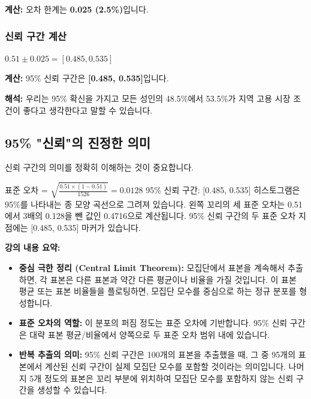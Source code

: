 \documentclass[11pt,a4paper]{article}
\theoremstyle{definition}
\begin{document}
\textbf{계산:}
오차 한계는 \textbf{0.025 (2.5\%)}입니다.

\subsubsection{신뢰 구간 계산}

\begin{tcolorbox}[title=슬라이드 71: 지역 고용 시장 조건이 좋은가? (2/2)]
$0.51 \pm 0.025 = [0.485, 0.535]$
\end{tcolorbox}

\textbf{계산:}
95\% 신뢰 구간은 \textbf{[0.485, 0.535]}입니다.

\textbf{해석:}
우리는 95\% 확신을 가지고 모든 성인의 48.5\%에서 53.5\%가 지역 고용 시장 조건이 좋다고 생각한다고 말할 수 있습니다.

\subsection{95\% "신뢰"의 진정한 의미}

신뢰 구간의 의미를 정확히 이해하는 것이 중요합니다.

\begin{tcolorbox}[title=슬라이드 72: 95\% "신뢰"는 실제로 무엇을 의미하는가?]
표준 오차 = $\sqrt{\frac{0.51 \times (1-0.51)}{1526}} = 0.0128$
95\% 신뢰 구간: [0.485, 0.535]
히스토그램은 95\%를 나타내는 종 모양 곡선으로 그려져 있습니다. 왼쪽 꼬리의 세 표준 오차는 0.51에서 3배의 0.128을 뺀 값인 0.4716으로 계산됩니다. 95\% 신뢰 구간의 두 표준 오차 지점에는 [0.485, 0.535] 마커가 있습니다.
\end{tcolorbox}

\textbf{강의 내용 요약:}
\begin{itemize}
    \item \textbf{중심 극한 정리 (Central Limit Theorem):} 모집단에서 표본을 계속해서 추출하면, 각 표본은 다른 표본과 약간 다른 평균이나 비율을 가질 것입니다. 이 표본 평균 또는 표본 비율들을 플로팅하면, 모집단 모수를 중심으로 하는 정규 분포를 형성합니다.
    \item \textbf{표준 오차의 역할:} 이 분포의 퍼짐 정도는 표준 오차에 기반합니다. 95\% 신뢰 구간은 대략 표본 평균/비율에서 양쪽으로 두 표준 오차 범위 내에 있습니다.
    \item \textbf{반복 추출의 의미:} 95\% 신뢰 구간은 100개의 표본을 추출했을 때, 그 중 95개의 표본에서 계산된 신뢰 구간이 실제 모집단 모수를 포함할 것이라는 의미입니다. 나머지 5개 정도의 표본은 꼬리 부분에 위치하여 모집단 모수를 포함하지 않는 신뢰 구간을 생성할 수 있습니다.
\end{itemize}
\end{document}
